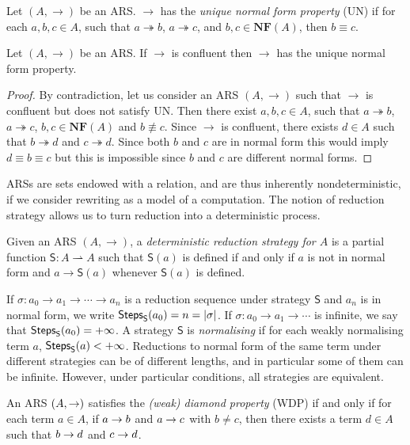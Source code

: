 \begin{definition}
	Let $(A,\rightarrow)$ be an ARS. $\rightarrow$ has the \emph{unique normal form property} (UN) if for each $a,b,c\in A$, such that $a\twoheadrightarrow b$, $a\twoheadrightarrow c$, and $b,c\in\mathbf{NF}(A)$, then $b\equiv c$.
\end{definition}
\begin{proposition}
	Let $(A,\rightarrow)$ be an ARS. If $\rightarrow$ is confluent then $\rightarrow$ has the unique normal form property.
\end{proposition}
\begin{proof}
	By contradiction, let us consider an ARS $(A,\rightarrow)$ such that $\rightarrow$ is confluent but does not satisfy UN. Then there exist $a,b,c\in A$, such that $a\twoheadrightarrow b$, $a\twoheadrightarrow c$, $b,c\in\mathbf{NF}(A)$ and $b\not\equiv c$. Since $\rightarrow$ is confluent, there exists $d\in A$ such that $b\twoheadrightarrow d$ and $c\twoheadrightarrow d$. Since both $b$ and $c$ are in normal form this would imply $d\equiv b\equiv c$ but this is impossible since $b$ and $c$ are different normal forms.
\end{proof}
ARSs are sets endowed with a relation, and are thus
inherently nondeterministic, if we consider rewriting as a model of a computation. The notion of reduction strategy allows us to turn reduction into a deterministic process.
\begin{definition}\label{def:determstrat}
	Given an ARS $(A,\rightarrow)$, a \emph{deterministic reduction
		strategy for $A$} is a partial function $\mathsf{S}:A\rightharpoonup A$
	such that $\mathsf{S}(a)$ is defined if and only if $a$ is not in
	normal form and $a\rightarrow\mathsf{S}(a)$ whenever $\mathsf{S}(a)$
	is defined.
\end{definition}
If $\sigma:a_0\rightarrow a_1\rightarrow\cdots\rightarrow a_n$ is a
reduction sequence under strategy $\mathsf{S}$ and $a_n$ is in normal
form, we write $\textsf{Steps}_{\mathsf{S}}(a_0)=n=|\sigma|$. If
$\sigma:a_0\rightarrow a_1\rightarrow\cdots$ is infinite, we say that
$\textsf{Steps}_{\mathsf{S}}(a_0)=+\infty$. A strategy $\mathsf{S}$ is \emph{normalising} if for each weakly normalising term $a$, $\textsf{Steps}_{\mathsf{S}}(a)<+\infty$. Reductions to normal form of the same term under different strategies can be of different lengths, and in particular some of them can be infinite. However, under particular conditions, all strategies are equivalent.
\begin{definition}
	An ARS $(A,\rightarrow)$ satisfies the \emph{(weak) diamond property} (WDP) if and only if for each term $a\in A$, if $a\rightarrow b$ and $a\rightarrow c$ with $b\neq c$, then there exists a term $d\in A$ such that $b\rightarrow d$ and $c\rightarrow d$. 
\end{definition}
